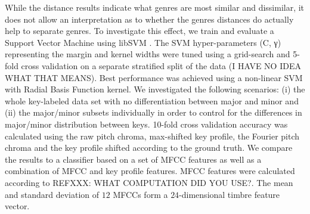 \documentclass{article}
\begin{document}
While the distance results indicate what genres are most similar and dissimilar, it does not allow an interpretation as to whether the genres distances do actually help to separate genres. To investigate this effect, we train and evaluate a Support Vector Machine using libSVM \cite{chang_libsvm:_2011}.
The SVM hyper-parameters (C, γ) representing the margin and kernel widths were tuned using a grid-search and 5-fold cross validation on a separate stratified split of the data (I HAVE NO IDEA WHAT THAT MEANS). Best performance was achieved using a non-linear SVM with Radial Basis Function kernel.
We investigated the following scenarios: (i) the whole key-labeled data set with no differentiation between major and minor and (ii) the major/minor subsets individually in order to control for the differences in major/minor distribution between keys. 
10-fold cross validation  accuracy was calculated using the raw pitch chroma, max-shifted key profile, the Fourier pitch chroma and the key profile shifted according to the ground truth. We compare the results to a classifier based on a set of MFCC features as well as a combination of MFCC and key profile features. MFCC features were calculated according to REFXXX: WHAT COMPUTATION DID YOU USE?. The mean and standard deviation of $12$ MFCCs form a $24$-dimensional timbre feature vector. %
\end{document}
